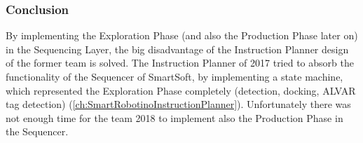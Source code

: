 \subsubsection{Conclusion }

By implementing the Exploration Phase (and also the Production Phase later on) in the Sequencing Layer, the big disadvantage of the Instruction Planner design of the former team is solved. The Instruction Planner of 2017 tried to absorb the functionality of the Sequencer of SmartSoft, by implementing a state machine, which represented the Exploration Phase completely (detection, docking, ALVAR tag detection) (\ref{ch:SmartRobotinoInstructionPlanner}).
Unfortunately there was not enough time for the team 2018 to implement also the Production Phase in the Sequencer.


